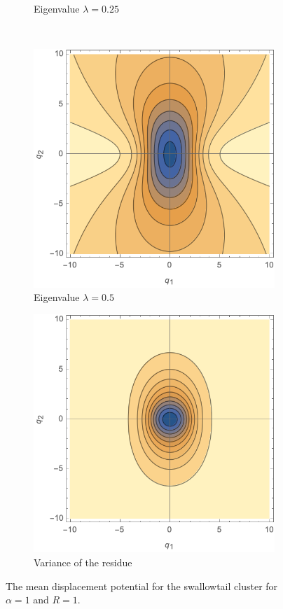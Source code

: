\documentclass[a4paper, 11pt]{article}
\begin{document}
\begin{figure}
\begin{subfigure}[b]{0.45\textwidth}
\caption{Eigenvalue $\lambda=0.25$}
\end{subfigure}\\
\begin{subfigure}[b]{0.45\textwidth}
\includegraphics[width=\textwidth]{A4Mean_lambda=050}
\caption{Eigenvalue $\lambda=0.5$}
\end{subfigure}
\begin{subfigure}[b]{0.45\textwidth}
\includegraphics[width=\textwidth]{A4Variance}
\caption{Variance of the residue}
\end{subfigure}
\caption{The mean displacement potential for the swallowtail cluster for $\alpha =1$ and $R=1$.}
\label{fig:A4Mean}
\end{figure}
\end{document}

